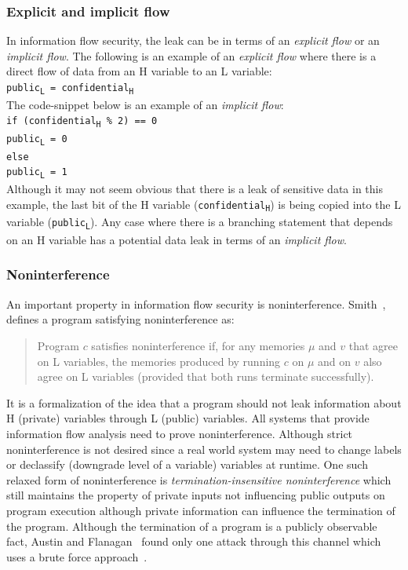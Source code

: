 \subsubsection{Explicit and implicit flow}
In information flow security, the leak can be in terms of an \textit{explicit flow}
or an \textit{implicit flow}. The following is an example of an \textit{explicit flow} where there is a direct
flow of data from an H variable to an L variable: \\
\indent
\texttt{public\textsubscript{L} = confidential\textsubscript{H}}
\eject
\noindent \\
The code-snippet below is an example of an \textit{implicit flow}: \\
\indent
	\texttt{if (confidential\textsubscript{H} \% 2)  == 0 \\ \indent \indent
		public\textsubscript{L} = 0 \\ \indent
	else \\ \indent \indent
		public\textsubscript{L} = 1} \\
\noindent Although it may not seem obvious that there is a leak of sensitive data
in this example, the last bit of the H variable (\texttt{confidential\textsubscript{H}})
is being copied into the L variable (\texttt{public\textsubscript{L}}). Any case
where there is a branching statement that depends on an H variable has a potential
data leak in terms of an \textit{implicit flow}.

\subsubsection{Noninterference \label{sec:noninterference}}
An important property in information flow security is noninterference. Smith~\cite{PrincInfoSec},
defines a program satisfying noninterference as:

\begin{quotation}
	\noindent Program $c$ satisfies noninterference if, for
	any memories $\mu$ and $v$ that agree on L variables, the memories produced by
	running $c$ on $\mu$ and on $v$ also agree on L variables (provided that both runs
	terminate successfully).
\end{quotation}
It is a formalization of the idea that a program should not leak
information about H (private) variables through L (public) variables. All systems
that provide information flow analysis need to prove noninterference. Although
strict noninterference is not desired since a real world system may need to change
labels or declassify (downgrade level of a variable) variables at runtime. One such
relaxed form of noninterference is \textit{termination-insensitive noninterference}
which still maintains the property of private inputs not influencing public outputs
on program execution although private information can influence the termination of
the program. Although the termination of a program is a publicly observable fact,
Austin and Flanagan~\cite{Faceted} found only one attack through this channel which
uses a brute force approach~\cite{TINI}.

